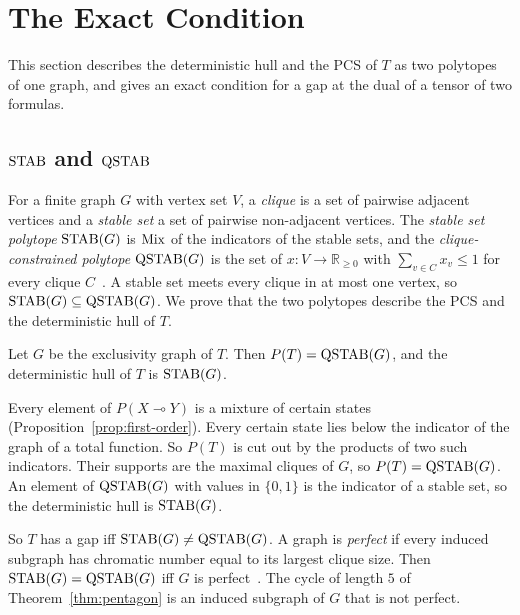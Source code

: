 \section{The Exact Condition}
\label{sec:exact}

This section describes the deterministic hull and the PCS of $T$ as two
polytopes of one graph, and gives an exact condition for a gap at the dual
of a tensor of two formulas.

\subsection{$\mathrm{STAB}$ and $\mathrm{QSTAB}$}
\label{sec:exact-stab}

For a finite graph $G$ with vertex set $V$, a \emph{clique} is a set of
pairwise adjacent vertices and a \emph{stable set} a set of pairwise
non-adjacent vertices. The \emph{stable set polytope} $\mathrm{STAB}(G)$ is $\mathrm{Mix}$
of the indicators of the stable sets, and the \emph{clique-constrained
polytope} $\mathrm{QSTAB}(G)$ is the set of $x : V \to \mathbb{R}_{\ge 0}$ with
$\sum_{v \in C} x_v \le 1$ for every clique $C$~\cite{gls1988}. A stable
set meets every clique in at most one vertex, so
$\mathrm{STAB}(G) \subseteq \mathrm{QSTAB}(G)$. We prove that the two polytopes describe
the PCS and the deterministic hull of $T$.

\begin{theorem}
\label{thm:qstab}
Let $G$ be the exclusivity graph of $T$. Then $P(T) = \mathrm{QSTAB}(G)$, and the
deterministic hull of $T$ is $\mathrm{STAB}(G)$.
\end{theorem}

\noindent
Every element of $P(X \multimap Y)$ is a mixture of certain states
(Proposition~\ref{prop:first-order}). Every certain state lies below
the indicator of the graph of a total function. So $P(T)$ is cut out by
the products of two such indicators. Their supports are the maximal
cliques of $G$, so $P(T) = \mathrm{QSTAB}(G)$. An element of $\mathrm{QSTAB}(G)$ with values in $\{0,1\}$
is the indicator of a stable set, so the deterministic hull is $\mathrm{STAB}(G)$.

So $T$ has a gap iff $\mathrm{STAB}(G) \ne \mathrm{QSTAB}(G)$. A graph is \emph{perfect}
if every induced subgraph has chromatic number equal to its largest
clique size. Then $\mathrm{STAB}(G) = \mathrm{QSTAB}(G)$ iff $G$ is
perfect~\cite{lovasz1972,chvatal1975}. The cycle of length $5$ of
Theorem~\ref{thm:pentagon} is an induced subgraph of $G$ that is not
perfect.

